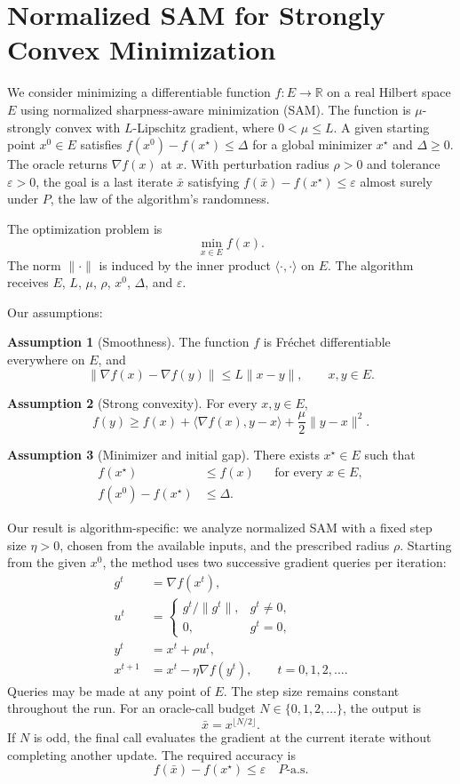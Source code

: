 \documentclass[10pt]{article}
\theoremstyle{definition}
\newtheorem{assumption}{Assumption}
\begin{document}
\section*{Normalized SAM for Strongly Convex Minimization}
We consider minimizing a differentiable function $f:E\to\mathbb{R}$ on a real Hilbert space $E$ using normalized sharpness-aware minimization (SAM). The function is $\mu$-strongly convex with $L$-Lipschitz gradient, where $0<\mu\leq L$. A given starting point $x^0\in E$ satisfies $f(x^0)-f(x^\star)\leq\Delta$ for a global minimizer $x^\star$ and $\Delta\geq0$. The oracle returns $\nabla f(x)$ at $x$. With perturbation radius $\rho>0$ and tolerance $\varepsilon>0$, the goal is a last iterate $\bar{x}$ satisfying $f(\bar{x})-f(x^\star)\leq\varepsilon$ almost surely under $P$, the law of the algorithm's randomness.

The optimization problem is
\[
\min_{x\in E} f(x).
\]
The norm $\|\cdot\|$ is induced by the inner product $\langle\cdot,\cdot\rangle$ on $E$. The algorithm receives $E$, $L$, $\mu$, $\rho$, $x^0$, $\Delta$, and $\varepsilon$.

Our assumptions:
\begin{assumption}[Smoothness]
The function $f$ is Fr\'echet differentiable everywhere on $E$, and
\[
\|\nabla f(x)-\nabla f(y)\|\leq L\|x-y\|,
\qquad x,y\in E.
\]
\end{assumption}

\begin{assumption}[Strong convexity]
For every $x,y\in E$,
\[
f(y)\geq f(x)+\langle\nabla f(x),y-x\rangle
+\frac{\mu}{2}\|y-x\|^2.
\]
\end{assumption}

\begin{assumption}[Minimizer and initial gap]
There exists $x^\star\in E$ such that
\[
\begin{aligned}
f(x^\star)&\leq f(x) &&\text{for every }x\in E,\\
f(x^0)-f(x^\star)&\leq\Delta.
\end{aligned}
\]
\end{assumption}

Our result is algorithm-specific: we analyze normalized SAM with a fixed step size $\eta>0$, chosen from the available inputs, and the prescribed radius $\rho$. Starting from the given $x^0$, the method uses two successive gradient queries per iteration:
\[
\begin{aligned}
g^t&=\nabla f(x^t),\\
u^t&=\begin{cases}
g^t/\|g^t\|, & g^t\neq0,\\
0, & g^t=0,
\end{cases}\\
y^t&=x^t+\rho u^t,\\
x^{t+1}&=x^t-\eta\nabla f(y^t),
\qquad t=0,1,2,\ldots.
\end{aligned}
\]
Queries may be made at any point of $E$. The step size remains constant throughout the run. For an oracle-call budget $N\in\{0,1,2,\ldots\}$, the output is
\[
\bar{x}=x^{\lfloor N/2\rfloor}.
\]
If $N$ is odd, the final call evaluates the gradient at the current iterate without completing another update. The required accuracy is
\[
f(\bar{x})-f(x^\star)\leq\varepsilon
\quad P\text{-a.s.}
\]
\end{document}
